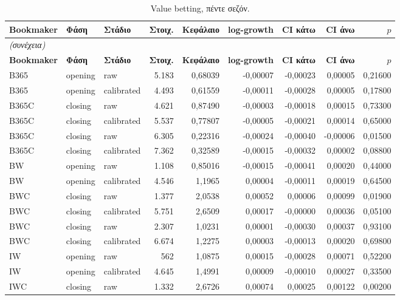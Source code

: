 {\footnotesize
\begin{longtable}{@{}lllrrrrrr@{}}
\caption{Value betting, πέντε σεζόν.}\label{app:vbrw}\\
\toprule \textbf{Bookmaker} & \textbf{Φάση} & \textbf{Στάδιο} & \textbf{Στοιχ.} & \textbf{Κεφάλαιο} & \textbf{log-growth} & \textbf{CI κάτω} & \textbf{CI άνω} & \textbf{$p$} \\\midrule\endfirsthead
\multicolumn{9}{l}{\emph{(συνέχεια)}}\\\toprule \textbf{Bookmaker} & \textbf{Φάση} & \textbf{Στάδιο} & \textbf{Στοιχ.} & \textbf{Κεφάλαιο} & \textbf{log-growth} & \textbf{CI κάτω} & \textbf{CI άνω} & \textbf{$p$} \\\midrule\endhead
\bottomrule\endfoot
B365 & opening & raw & 5.183 & 0,68039 & -0,00007 & -0,00023 & 0,00005 & 0,21600 \\
B365 & opening & calibrated & 4.493 & 0,61559 & -0,00011 & -0,00028 & 0,00005 & 0,17800 \\
B365C & closing & raw & 4.621 & 0,87490 & -0,00003 & -0,00018 & 0,00015 & 0,73300 \\
B365C & closing & calibrated & 5.537 & 0,77807 & -0,00005 & -0,00021 & 0,00014 & 0,65000 \\
B365C & closing & raw & 6.305 & 0,22316 & -0,00024 & -0,00040 & -0,00006 & 0,01500 \\
B365C & closing & calibrated & 7.362 & 0,32589 & -0,00015 & -0,00032 & 0,00002 & 0,08800 \\
BW & opening & raw & 1.108 & 0,85016 & -0,00015 & -0,00041 & 0,00020 & 0,44000 \\
BW & opening & calibrated & 4.546 & 1,1965 & 0,00004 & -0,00011 & 0,00019 & 0,64500 \\
BWC & closing & raw & 1.377 & 2,0538 & 0,00052 & 0,00006 & 0,00099 & 0,01900 \\
BWC & closing & calibrated & 5.751 & 2,6509 & 0,00017 & -0,00000 & 0,00036 & 0,05100 \\
BWC & closing & raw & 2.307 & 1,0231 & 0,00001 & -0,00030 & 0,00037 & 0,93100 \\
BWC & closing & calibrated & 6.674 & 1,2275 & 0,00003 & -0,00013 & 0,00020 & 0,69800 \\
IW & opening & raw & 562 & 1,0875 & 0,00015 & -0,00028 & 0,00071 & 0,52200 \\
IW & opening & calibrated & 4.645 & 1,4991 & 0,00009 & -0,00010 & 0,00027 & 0,33500 \\
IWC & closing & raw & 1.332 & 2,6726 & 0,00074 & 0,00025 & 0,00122 & 0,00200 \\

\end{longtable}}
